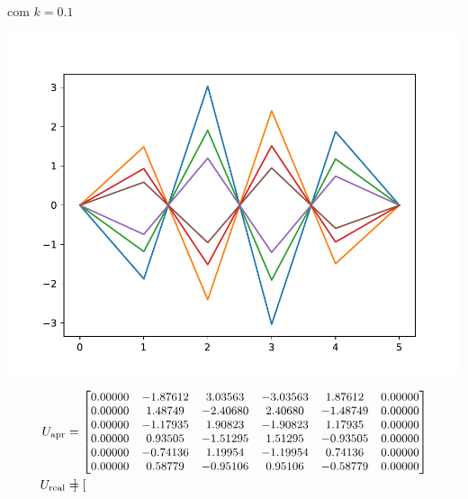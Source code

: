 \documentclass[a4paper, 11pt]{report}
\begin{document}
\begin{enumerate}[leftmargin=*]
        \begin{minipage}{0.35\columnwidth}
            \begin{center}
                com $k = 0.1$
            \end{center}
            \includegraphics[width=\columnwidth]{../edp/12.2_5a1.pdf}
        \end{minipage}
        \begin{minipage}{0.6\columnwidth}
            \begin{align*}
                U_{\text{apr}} &= 
                {\small
                \begin{bmatrix}
                    0.00000 & -1.87612 &   3.03563 &  -3.03563 &  1.87612  & 0.00000\\  
                    0.00000 &  1.48749 &  -2.40680 &   2.40680 & -1.48749  & 0.00000\\  
                    0.00000 & -1.17935 &   1.90823 &  -1.90823 &  1.17935  & 0.00000\\  
                    0.00000 &  0.93505 &  -1.51295 &   1.51295 & -0.93505  & 0.00000\\  
                    0.00000 & -0.74136 &   1.19954 &  -1.19954 &  0.74136  & 0.00000\\  
                    0.00000 &  0.58779 &  -0.95106 &   0.95106 & -0.58779  & 0.00000\\ 
                \end{bmatrix}}\\
                U_{\text{real}} &=
                {\small
                \begin{bmatrix}

\end{bmatrix}}
\end{align*}
\end{minipage}
\end{enumerate}
\end{document}
